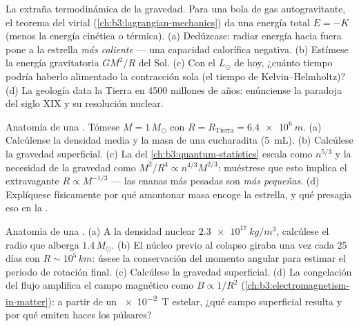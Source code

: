 \begin{exercise}[$\star\star$]\label{exo:b3:astrophysics:5}
La extraña termodinámica de la gravedad. Para una bola de gas autogravitante,
el teorema del virial (\cref{ch:b3:lagrangian-mechanics})
da una energía total $E = -K$ (menos la energía cinética o térmica).
(a) Dedúzcase: radiar energía hacia fuera pone a la estrella \emph{más caliente}
--- una capacidad calorífica negativa. (b) Estímese la energía
gravitatoria $GM^2/R$ del Sol. (c) Con el $L_\odot$ de hoy, ¿cuánto tiempo
podría haberlo alimentado la contracción sola (el tiempo de
Kelvin--Helmholtz)? (d) La geología data la Tierra en 4500 millones de años: enúnciense la
paradoja del siglo XIX y su resolución nuclear.
\end{exercise}

\begin{exercise}[$\star\star$]\label{exo:b3:astrophysics:6}
Anatomía de una . Tómese $M = 1\,M_\odot$ con
$R = R_{\text{Tierra}} = \qty{6.4e6}{m}$. (a) Calcúlense la densidad
media y la masa de una cucharadita (\qty{5}{mL}). (b) Calcúlese la
gravedad superficial. (c) La  del
\cref{ch:b3:quantum-statistics} escala como $n^{5/3}$ y la necesidad de la gravedad como
$M^2/R^4 \propto n^{4/3}M^{2/3}$: muéstrese que esto implica el
extravagante $R \propto M^{-1/3}$ --- las enanas más pesadas son
\emph{más pequeñas}. (d) Explíquese físicamente por qué amontonar masa
encoge la estrella, y qué presagia eso en la .
\end{exercise}

\begin{exercise}[$\star\star$]\label{exo:b3:astrophysics:7}
Anatomía de una . (a) A la densidad nuclear
$\qty{2.3e17}{kg/m^3}$, calcúlese el radio que alberga
$1.4\,M_\odot$. (b) El núcleo previo al colapso giraba una vez cada 25 días
con $R \sim 10^5\,\unit{km}$: úsese la conservación del momento angular
para estimar el periodo de rotación final. (c) Calcúlese la gravedad
superficial. (d) La congelación del flujo amplifica el campo magnético como
$B \propto 1/R^2$ (\cref{ch:b3:electromagnetism-in-matter}):
a partir de un \qty{e-2}{T} estelar, ¿qué campo superficial resulta y
por qué emiten haces los púlsares?
\end{exercise}

